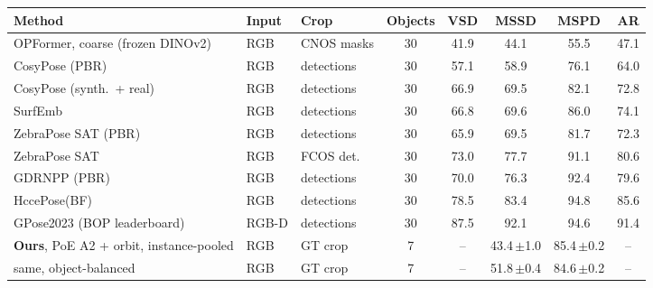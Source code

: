 \begin{tabular}{@{}l l l c cccc@{}}
\toprule
Method & Input & Crop & Objects & VSD & MSSD & MSPD & AR \\
\midrule
OPFormer, coarse (frozen DINOv2)~\cite{moroz2025opformer} & RGB & CNOS masks & 30 & 41.9 & 44.1 & 55.5 & 47.1 \\
CosyPose (PBR)~\cite{labbe2020cosypose} & RGB & detections & 30 & 57.1 & 58.9 & 76.1 & 64.0 \\
CosyPose (synth.\ + real)~\cite{labbe2020cosypose} & RGB & detections & 30 & 66.9 & 69.5 & 82.1 & 72.8 \\
SurfEmb~\cite{haugaard2022surfemb} & RGB & detections & 30 & 66.8 & 69.6 & 86.0 & 74.1 \\
ZebraPose SAT (PBR)~\cite{su2022zebrapose} & RGB & detections & 30 & 65.9 & 69.5 & 81.7 & 72.3 \\
ZebraPose SAT~\cite{su2022zebrapose} & RGB & FCOS det. & 30 & 73.0 & 77.7 & 91.1 & 80.6 \\
GDRNPP (PBR)~\cite{liu2025gdrnpp} & RGB & detections & 30 & 70.0 & 76.3 & 92.4 & 79.6 \\
HccePose(BF)~\cite{wang2025hccepose} & RGB & detections & 30 & 78.5 & 83.4 & 94.8 & 85.6 \\
GPose2023 (BOP leaderboard) & RGB-D & detections & 30 & 87.5 & 92.1 & 94.6 & 91.4 \\
\midrule
\textbf{Ours}, PoE A2 + orbit, instance-pooled & RGB & GT crop & 7 & -- & 43.4\,{\scriptsize$\pm$1.0} & 85.4\,{\scriptsize$\pm$0.2} & -- \\
\quad same, object-balanced & RGB & GT crop & 7 & -- & 51.8\,{\scriptsize$\pm$0.4} & 84.6\,{\scriptsize$\pm$0.2} & -- \\
\bottomrule
\end{tabular}